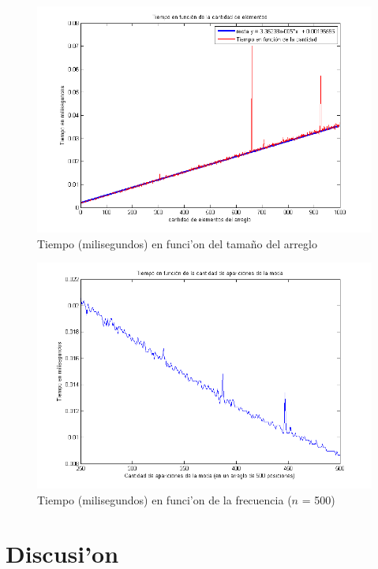 \begin{figure}[H]
\centering
\includegraphics[scale=0.8]{../../codigo/ejercicio3/benchmark_de_tiempo/graficos/moda-1000-casos.png}
\caption{Tiempo (milisegundos) en funci'on del tama\~{n}o del arreglo}
\end{figure}

\begin{figure}[H]
\centering
\includegraphics[scale=0.8]{../../codigo/ejercicio3/benchmark_de_tiempo/graficos/aumento-frecuencia.png}
\caption{Tiempo (milisegundos) en funci'on de la frecuencia ($n$ = 500)}
\end{figure}

\section{Discusi'on}
